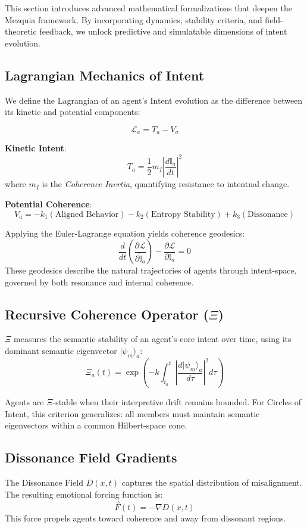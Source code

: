 \documentclass[12pt]{article}
\begin{document}
This section introduces advanced mathematical formalizations that deepen the Mezquia framework. By incorporating dynamics, stability criteria, and field-theoretic feedback, we unlock predictive and simulatable dimensions of intent evolution.

\subsection{Lagrangian Mechanics of Intent}

We define the Lagrangian of an agent's Intent evolution as the difference between its kinetic and potential components:

\[
\mathcal{L}_a = T_a - V_a
\]

\textbf{Kinetic Intent}:
\[
T_a = \frac{1}{2} m_I \left| \frac{d\mathbb{I}_a}{dt} \right|^2
\]
where \(m_I\) is the \emph{Coherence Inertia}, quantifying resistance to intentual change.

\textbf{Potential Coherence}:
\[
V_a = -k_1 (\text{Aligned Behavior}) - k_2 (\text{Entropy Stability}) + k_3 (\text{Dissonance})
\]

Applying the Euler-Lagrange equation yields coherence geodesics:
\[
\frac{d}{dt} \left( \frac{\partial \mathcal{L}}{\partial \dot{\mathbb{I}}_a} \right) - \frac{\partial \mathcal{L}}{\partial \mathbb{I}_a} = 0
\]
These geodesics describe the natural trajectories of agents through intent-space, governed by both resonance and internal coherence.

\subsection{Recursive Coherence Operator (\(\Xi\))}

\(\Xi\) measures the semantic stability of an agent’s core intent over time, using its dominant semantic eigenvector \(|\psi_m\rangle_a\):
\[
\Xi_a(t) = \exp\left( -k \int_{t_0}^{t} \left| \frac{d|\psi_m\rangle_a}{d\tau} \right|^2 d\tau \right)
\]

Agents are \(\Xi\)-stable when their interpretive drift remains bounded. For Circles of Intent, this criterion generalizes: all members must maintain semantic eigenvectors within a common Hilbert-space cone.

\subsection{Dissonance Field Gradients}

The Dissonance Field \(D(x,t)\) captures the spatial distribution of misalignment. The resulting emotional forcing function is:
\[
\vec{F}(t) = -\nabla D(x,t)
\]
This force propels agents toward coherence and away from dissonant regions.
\end{document}
